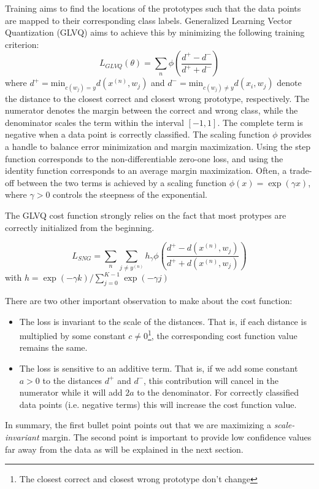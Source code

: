 \documentclass{esannV2}
\begin{document}
Training aims to find the locations of the prototypes such that the data points are mapped to their corresponding class labels. Generalized Learning Vector Quantization (GLVQ) \cite{sato1996generalized} aims to achieve this by minimizing the following training criterion:
\begin{equation}
 L_{GLVQ}(\theta) = \sum_n \phi\left(\frac{d^+ - d^-}{d^+ + d^-}\right)
\end{equation}
where $d^+ = \mbox{min}_{c(w_j) = y} d(x^{(n)}, w_j)$ and $d^- = \mbox{min}_{c(w_j)\neq y} d(x_i, w_j)$ denote the distance to the closest correct and closest wrong prototype, respectively. The numerator denotes the margin between the correct and wrong class, while the denominator scales the term within the interval $[-1, 1]$. The complete term is negative when a data point is correctly classified. The scaling function $\phi$ provides a handle to balance error minimization and margin maximization. Using the step function corresponds to the non-differentiable zero-one loss, and using the identity function corresponds to an average margin maximization. Often, a trade-off between the two terms is achieved by a scaling function $\phi(x) = \exp(\gamma x)$, where $\gamma > 0$ controls the steepness of the exponential. 

The GLVQ cost function strongly relies on the fact that most protypes are correctly initialized from the beginning. 

\begin{equation}
 L_{SNG} = \sum_n \sum_{j\neq y^{(n)}} h_\gamma \phi\left(\frac{d^+ - d(x^{(n)}, w_j)}{d^+ + d(x^{(n)}, w_j)}\right)
\end{equation}
with $h = \exp(-\gamma k)/ \sum_{j=0}^{K-1} \exp(-\gamma j)$

There are two other important observation to make about the cost function: 
\begin{itemize}
\item The loss is invariant to the scale of the distances. That is, if each distance is multiplied by some constant $c \neq 0$\footnote{The closest correct and closest wrong prototype don't change}, the corresponding cost function value remains the same. 
\item The loss is sensitive to an additive term. That is, if we add some constant $a > 0$ to the distances $d^+$ and $d^-$, this contribution will cancel in the numerator while it will add $2a$ to the denominator. For correctly classified data points (i.e. negative terms) this will increase the cost function value.          
\end{itemize} 
In summary, the first bullet point points out that we are maximizing a \emph{scale-invariant} margin. The second point is important to provide low confidence values far away from the data as will be explained in the next section. 
\end{document}
